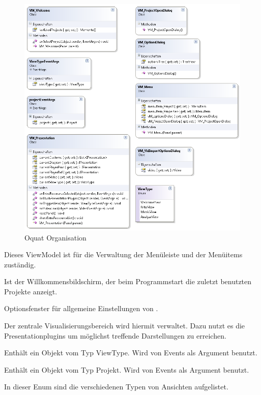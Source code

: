 \begin{figure}[H]
\noindent\includegraphics[width=\linewidth,height=\textheight,
keepaspectratio]{bilder/Klassendiagramm/VM2.png}
\caption{Oquat Organisation}
\end{figure}

Dieses ViewModel ist für die Verwaltung der Menüleiste und der Menüitems zuständig.


Ist der Willkommensbildschirm, der beim Programmstart die zuletzt benutzten Projekte anzeigt.


Optionsfenster für allgemeine Einstellungen von \projektTitel.


Der zentrale Visualisierungsbereich wird hiermit verwaltet. Dazu nutzt es die Presentationplugins um möglichst treffende Darstellungen zu erreichen.


Enthält ein Objekt vom Typ ViewType. Wird von Events als Argument benutzt.


Enthält ein Objekt vom Typ Projekt. Wird von Events als Argument benutzt.


In dieser Enum sind die verschiedenen Typen von Ansichten aufgelistet.

